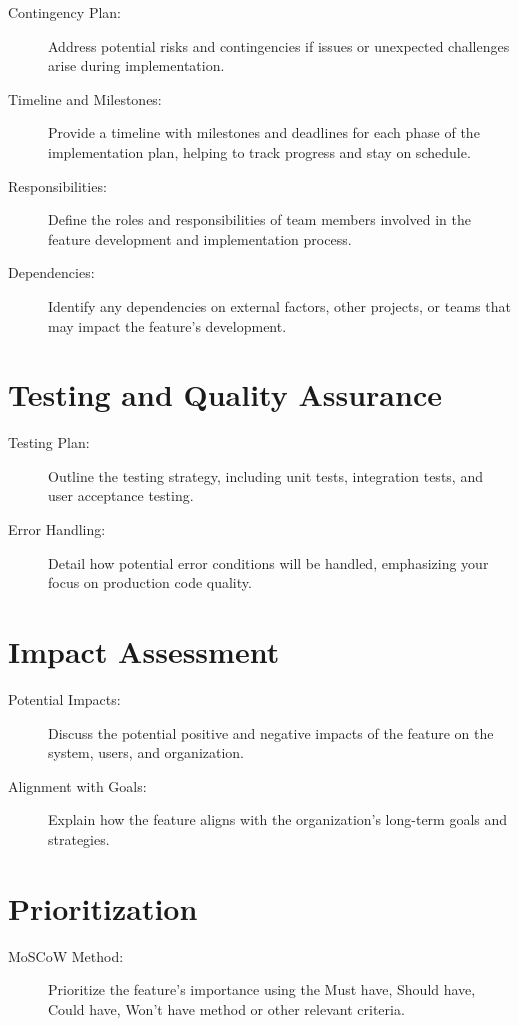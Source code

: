 \documentclass{article}
\begin{document}
\begin{description}
    \item[Contingency Plan:]
    Address potential risks and contingencies if issues or unexpected challenges arise during implementation.

    \item[Timeline and Milestones:]
    Provide a timeline with milestones and deadlines for each phase of the implementation plan, helping to track progress and stay on schedule.

    \item[Responsibilities:]
    Define the roles and responsibilities of team members involved in the feature development and implementation process.

    \item[Dependencies:]
    Identify any dependencies on external factors, other projects, or teams that may impact the feature's development.

\end{description}

\section{Testing and Quality Assurance}
\begin{description}
    \item[Testing Plan:] Outline the testing strategy, including unit tests, integration tests, and user acceptance testing.
    \item[Error Handling:] Detail how potential error conditions will be handled, emphasizing your focus on production code quality.
\end{description}

\section{Impact Assessment}
\begin{description}
    \item[Potential Impacts:] Discuss the potential positive and negative impacts of the feature on the system, users, and organization.
    \item[Alignment with Goals:] Explain how the feature aligns with the organization's long-term goals and strategies.
\end{description}

\section{Prioritization}
\begin{description}
    \item[MoSCoW Method:] Prioritize the feature's importance using the Must have, Should have, Could have, Won't have method or other relevant criteria.
\end{description}
\end{document}
